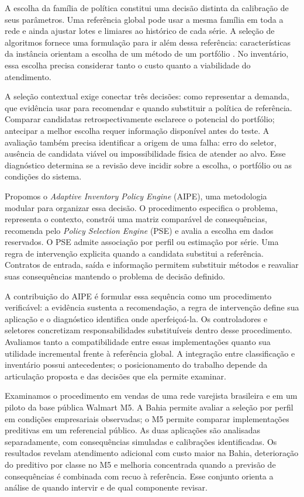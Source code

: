 \documentclass[preprint,12pt]{elsarticle}
\begin{document}
A escolha da família de política constitui uma decisão distinta da calibração de seus parâmetros. Uma referência global pode usar a mesma família em toda a rede e ainda ajustar lotes e limiares ao histórico de cada série. A seleção de algoritmos fornece uma formulação para ir além dessa referência: características da instância orientam a escolha de um método de um portfólio \cite{rice1976,Kotthoff2014AlgorithmSelection}. No inventário, essa escolha precisa considerar tanto o custo quanto a viabilidade do atendimento.

A seleção contextual exige conectar três decisões: como representar a demanda, que evidência usar para recomendar e quando substituir a política de referência. Comparar candidatas retrospectivamente esclarece o potencial do portfólio; antecipar a melhor escolha requer informação disponível antes do teste. A avaliação também precisa identificar a origem de uma falha: erro do seletor, ausência de candidata viável ou impossibilidade física de atender ao alvo. Esse diagnóstico determina se a revisão deve incidir sobre a escolha, o portfólio ou as condições do sistema.

Propomos o \textit{Adaptive Inventory Policy Engine} (AIPE), uma metodologia modular para organizar essa decisão. O procedimento especifica o problema, representa o contexto, constrói uma matriz comparável de consequências, recomenda pelo \textit{Policy Selection Engine} (PSE) e avalia a escolha em dados reservados. O PSE admite associação por perfil ou estimação por série. Uma regra de intervenção explicita quando a candidata substitui a referência. Contratos de entrada, saída e informação permitem substituir métodos e reavaliar suas consequências mantendo o problema de decisão definido.

A contribuição do AIPE é formular essa sequência como um procedimento verificável: a evidência sustenta a recomendação, a regra de intervenção define sua aplicação e o diagnóstico identifica onde aperfeiçoá-la. Os controladores e seletores concretizam responsabilidades substituíveis dentro desse procedimento. Avaliamos tanto a compatibilidade entre essas implementações quanto sua utilidade incremental frente à referência global. A integração entre classificação e inventário possui antecedentes; o posicionamento do trabalho depende da articulação proposta e das decisões que ela permite examinar.

Examinamos o procedimento em vendas de uma rede varejista brasileira e em um piloto da base pública Walmart M5. A Bahia permite avaliar a seleção por perfil em condições empresariais observadas; o M5 permite comparar implementações preditivas em um referencial público. As duas aplicações são analisadas separadamente, com consequências simuladas e calibrações identificadas. Os resultados revelam atendimento adicional com custo maior na Bahia, deterioração do preditivo por classe no M5 e melhoria concentrada quando a previsão de consequências é combinada com recuo à referência. Esse conjunto orienta a análise de quando intervir e de qual componente revisar.
\end{document}
